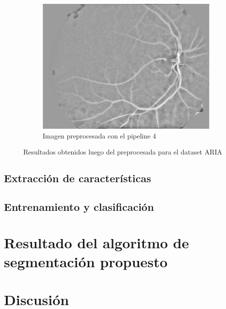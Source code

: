 \begin{figure} [H]
\begin{subfigure}[b]{0.3\textwidth}
        \label{fig:tiger}
    \end{subfigure}
    ~ %
    \begin{subfigure}[b]{0.3\textwidth}
        \includegraphics[width=\textwidth]{Figures/ARIA/pipe4-aria_c_39_a_10_cropped}
        \caption{Imagen preprocesada con el pipeline 4}
        \label{fig:mouse}
    \end{subfigure}
    \caption{Resultados obtenidos luego del preprocesada para el dataset ARIA}\label{fig:animals}
\end{figure}

\subsection{Extracci\'on de caracter\'isticas}



\subsection{Entrenamiento y clasificaci\'on}

\section{Resultado del algoritmo de segmentaci\'on propuesto}

\section{Discusi\'on}

